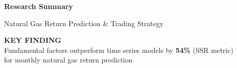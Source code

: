 \documentclass[12pt,a4paper]{article}
\begin{document}
\newpage
\thispagestyle{empty}  %

\begin{center}
{\Huge\bfseries Research Summary}
\vspace{0.3cm}

{\large Natural Gas Return Prediction \& Trading Strategy}
\end{center}

\vspace{0.4cm}

\noindent\colorbox{blue!10}{%
    \parbox{0.96\textwidth}{%
        \centering
        \textbf{\Large KEY FINDING} \\[0.2cm]
        {\large Fundamental factors outperform time series models by \textbf{54\%} (SSR metric) \\
        for monthly natural gas return prediction}
    }%
}

\vspace{0.4cm}
\end{document}
